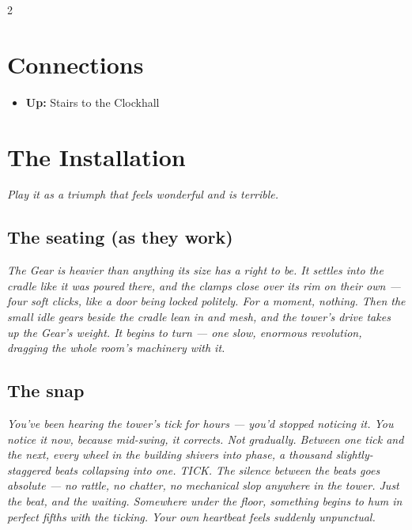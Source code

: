 \documentclass[10pt,letterpaper]{article}
\begin{document}
\begin{multicols}{2}
\section*{Connections}
\begin{itemize}
\item \textbf{Up:} Stairs to the Clockhall
\end{itemize}

\section*{The Installation}
\textit{Play it as a triumph that feels wonderful and is terrible.}

\subsection*{The seating (as they work)}
\begin{readaloud}
\itshape
The Gear is heavier than anything its size has a right to be. It settles into the cradle like it was poured there, and the clamps close over its rim on their own --- four soft clicks, like a door being locked politely. For a moment, nothing. Then the small idle gears beside the cradle lean in and mesh, and the tower's drive takes up the Gear's weight. It begins to turn --- one slow, enormous revolution, dragging the whole room's machinery with it.
\end{readaloud}

\subsection*{The snap}
\begin{readaloud}
\itshape
You've been hearing the tower's tick for hours --- you'd stopped noticing it. You notice it now, because mid-swing, it corrects. Not gradually. Between one tick and the next, every wheel in the building shivers into phase, a thousand slightly-staggered beats collapsing into one. TICK. The silence between the beats goes absolute --- no rattle, no chatter, no mechanical slop anywhere in the tower. Just the beat, and the waiting. Somewhere under the floor, something begins to hum in perfect fifths with the ticking. Your own heartbeat feels suddenly unpunctual.
\end{readaloud}


\end{multicols}
\end{document}
